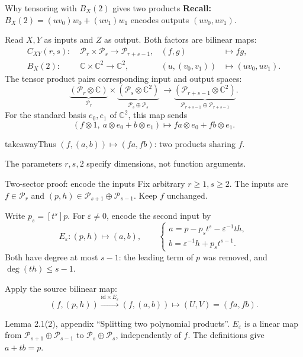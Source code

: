 \documentclass[aspectratio=169,11pt]{beamer}
\newcommand{\CC}{\mathbb C}
\newcommand{\source}[1]{\vfill\par{\fontsize{7.5}{9}\selectfont\color{muted}#1\par}}
\newcommand{\takeaway}[1]{\begin{beamercolorbox}[sep=0.65em,wd=\linewidth]{takeaway}#1\end{beamercolorbox}}
\begin{document}
\begin{frame}{Why tensoring with $B_X(2)$ gives two products}
  \textbf{Recall:} $B_X(2)=(uv_0)w_0+(uv_1)w_1$ encodes outputs $(uv_0,uv_1)$.
  \par\smallskip
  Read $X,Y$ as inputs and $Z$ as output. Both factors are bilinear maps:
  \[
  \begin{aligned}
    C_{XY}(r,s):\;&\mathcal P_r\times\mathcal P_s\to\mathcal P_{r+s-1},
      & (f,g)&\longmapsto fg,\\
    B_X(2):\;&\CC\times\CC^2\to\CC^2,
      & (u,(v_0,v_1))&\longmapsto(uv_0,uv_1).
  \end{aligned}
  \]
  The tensor product pairs corresponding input and output spaces:
  \[
    \underbrace{(\mathcal P_r\otimes\CC)}_{\mathcal P_r}
    \times
    \underbrace{(\mathcal P_s\otimes\CC^2)}_{\mathcal P_s\oplus\mathcal P_s}
    \ \longrightarrow
    \underbrace{(\mathcal P_{r+s-1}\otimes\CC^2)}_
      {\mathcal P_{r+s-1}\oplus\mathcal P_{r+s-1}}.
  \]
  For the standard basis $e_0,e_1$ of $\CC^2$, this map sends
  \[
    (f\otimes1,\ a\otimes e_0+b\otimes e_1)
      \longmapsto fa\otimes e_0+fb\otimes e_1.
  \]
  \takeaway{Thus $(f,(a,b))\mapsto(fa,fb)$: two products sharing $f$.}
  \source{The parameters $r,s,2$ specify dimensions, not function arguments.}
\end{frame}

\begin{frame}{Two-sector proof: encode the inputs}
  Fix arbitrary $r\ge1,s\ge2$. The inputs are
  $f\in\mathcal P_r$ and $(p,h)\in\mathcal P_{s+1}\oplus\mathcal P_{s-1}$.
  Keep $f$ unchanged.
  \par\medskip
  Write $p_s=[t^s]p$. For $\varepsilon\ne0$, encode the second input by
  \[
    E_\varepsilon:(p,h)\longmapsto(a,b),\qquad
    \begin{cases}
      a=p-p_s t^s-\varepsilon^{-1}th,\\
      b=\varepsilon^{-1}h+p_s t^{s-1}.
    \end{cases}
  \]
  Both have degree at most $s-1$: the leading term of $p$ was removed,
  and $\deg(th)\le s-1$.
  \par\medskip
  Apply the source bilinear map:
  \[
    (f,(p,h))\xrightarrow{\mathrm{id}\times E_\varepsilon}
    (f,(a,b))\longmapsto(U,V)=(fa,fb).
  \]
  \source{Lemma 2.1(2), appendix ``Splitting two polynomial products''.
  $E_\varepsilon$ is a linear map from $\mathcal P_{s+1}\oplus\mathcal P_{s-1}$
  to $\mathcal P_s\oplus\mathcal P_s$, independently of $f$.
  The definitions give $a+tb=p$.}
\end{frame}
\end{document}
